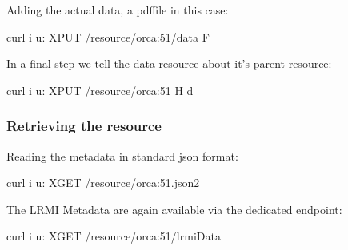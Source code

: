 \documentclass[letterpaper,10pt,english]{sphinxmanual}
\begin{document}
\sphinxAtStartPar
Adding the actual data, a pdf\sphinxhyphen{}file in this case:

\begin{sphinxVerbatim}[commandchars=\\\{\}]
\PYGZdl{} curl \PYGZhy{}i \PYGZhy{}u: \PYGZhy{}XPUT /resource/orca:51/data \PYGZhy{}F  
\end{sphinxVerbatim}

\sphinxAtStartPar
In a final step we tell the data resource about it’s parent resource:

\begin{sphinxVerbatim}[commandchars=\\\{\}]
\PYGZdl{} curl \PYGZhy{}i \PYGZhy{}u: \PYGZhy{}XPUT /resource/orca:51 \PYGZhy{}H \PYGZhy{}d  
\end{sphinxVerbatim}


\subsubsection{Retrieving the resource}
\label{\detokenize{api-complex-example:retrieving-the-resource}}
\sphinxAtStartPar
Reading the metadata in standard json format:

\begin{sphinxVerbatim}[commandchars=\\\{\}]
\PYGZdl{} curl \PYGZhy{}i \PYGZhy{}u: \PYGZhy{}XGET /resource/orca:51.json2  
\end{sphinxVerbatim}

\sphinxAtStartPar
The LRMI Metadata are again available via the dedicated endpoint:

\begin{sphinxVerbatim}[commandchars=\\\{\}]
\PYGZdl{} curl \PYGZhy{}i \PYGZhy{}u: \PYGZhy{}XGET /resource/orca:51/lrmiData  
\end{sphinxVerbatim}
\end{document}
